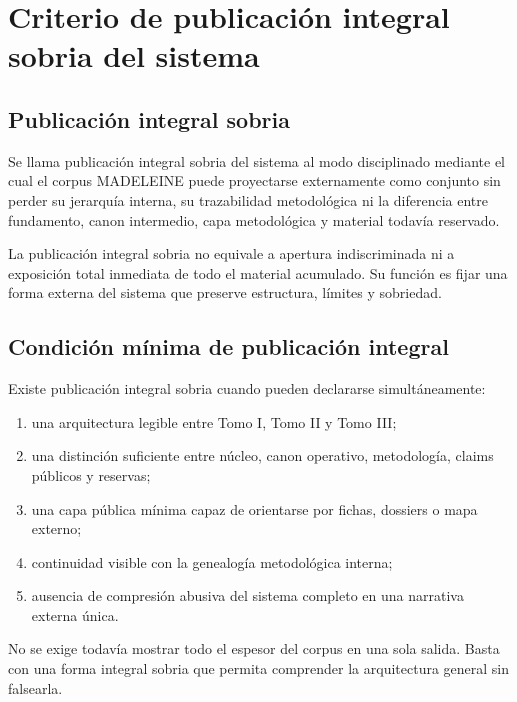 \chapter{Criterio de publicación integral sobria del sistema}

\section{Publicación integral sobria}
\begin{definition}
Se llama publicación integral sobria del sistema al modo disciplinado mediante el cual el corpus MADELEINE puede proyectarse externamente como conjunto sin perder su jerarquía interna, su trazabilidad metodológica ni la diferencia entre fundamento, canon intermedio, capa metodológica y material todavía reservado.
\end{definition}

\begin{observation}
La publicación integral sobria no equivale a apertura indiscriminada ni a exposición total inmediata de todo el material acumulado. Su función es fijar una forma externa del sistema que preserve estructura, límites y sobriedad.
\end{observation}

\section{Condición mínima de publicación integral}
\begin{definition}
Existe publicación integral sobria cuando pueden declararse simultáneamente:
\begin{enumerate}
  \item una arquitectura legible entre Tomo I, Tomo II y Tomo III;
  \item una distinción suficiente entre núcleo, canon operativo, metodología, claims públicos y reservas;
  \item una capa pública mínima capaz de orientarse por fichas, dossiers o mapa externo;
  \item continuidad visible con la genealogía metodológica interna;
  \item ausencia de compresión abusiva del sistema completo en una narrativa externa única.
\end{enumerate}
\end{definition}

\begin{observation}
No se exige todavía mostrar todo el espesor del corpus en una sola salida. Basta con una forma integral sobria que permita comprender la arquitectura general sin falsearla.
\end{observation}

